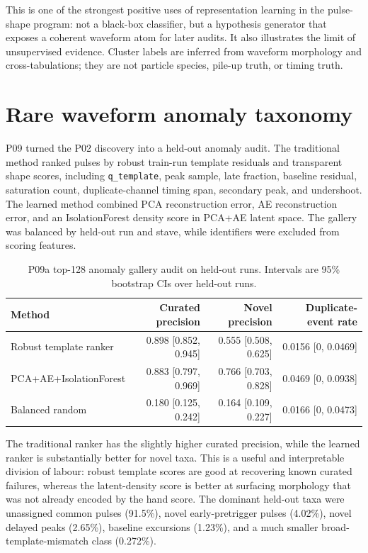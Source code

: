 This is one of the strongest positive uses of representation learning in the pulse-shape
program: not a black-box classifier, but a hypothesis generator that exposes a coherent waveform
atom for later audits.  It also illustrates the limit of unsupervised evidence.  Cluster labels
are inferred from waveform morphology and cross-tabulations; they are not particle species,
pile-up truth, or timing truth.

\section{Rare waveform anomaly taxonomy}

P09 turned the P02 discovery into a held-out anomaly audit.  The traditional method ranked
pulses by robust train-run template residuals and transparent shape scores, including
\texttt{q\_template}, peak sample, late fraction, baseline residual, saturation count,
duplicate-channel timing span, secondary peak, and undershoot.  The learned method combined PCA
reconstruction error, AE reconstruction error, and an IsolationForest density score in PCA+AE
latent space.  The gallery was balanced by held-out run and stave, while identifiers were
excluded from scoring features.

\begin{table}[H]
\centering
\caption{P09a top-128 anomaly gallery audit on held-out runs.  Intervals are 95\% bootstrap CIs
over held-out runs.}
\begin{tabular}{lrrr}
\toprule
Method & Curated precision & Novel precision & Duplicate-event rate \\
\midrule
Robust template ranker & 0.898 [0.852, 0.945] & 0.555 [0.508, 0.625] & 0.0156 [0, 0.0469] \\
PCA+AE+IsolationForest & 0.883 [0.797, 0.969] & 0.766 [0.703, 0.828] & 0.0469 [0, 0.0938] \\
Balanced random & 0.180 [0.125, 0.242] & 0.164 [0.109, 0.227] & 0.0166 [0, 0.0473] \\
\bottomrule
\end{tabular}
\end{table}

The traditional ranker has the slightly higher curated precision, while the learned ranker is
substantially better for novel taxa.  This is a useful and interpretable division of labour:
robust template scores are good at recovering known curated failures, whereas the latent-density
score is better at surfacing morphology that was not already encoded by the hand score.  The
dominant held-out taxa were unassigned common pulses (91.5\%), novel early-pretrigger pulses
(4.02\%), novel delayed peaks (2.65\%), baseline excursions (1.23\%), and a much smaller
broad-template-mismatch class (0.272\%).

